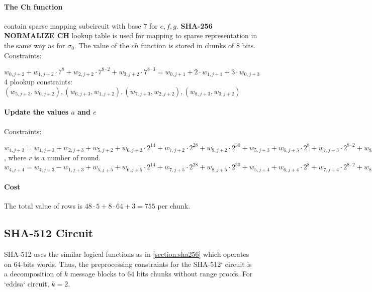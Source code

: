 \paragraph{The Ch function}
contain sparse mapping subcircuit with base $7$ for $e, f ,g$.
\textbf{SHA-256 NORMALIZE CH} lookup table is used for mapping to sparse representation in the same way as for $\sigma_0$.
The value of the $ ch $ function is stored in chunks of $8$ bits.
Constraints:
\begin{center}
    $w_{0, j + 2} + w_{1, j + 2} \cdot 7^8 + w_{2, j + 2} \cdot 7^{8 \cdot 2} + w_{3, j + 2} \cdot 7^{8 \cdot 3} = w_{0, j + 1} + 2 \cdot w_{1, j + 1} + 3 \cdot w_{0, j + 3}$ \\
    4 plookup constraints: $( w_{5, j + 3}, w_{0, j + 2}), ( w_{6, j + 3}, w_{1, j + 2}), (w_{7, j + 3}, w_{2, j + 2}), (w_{8, j + 3}, w_{3, j + 2})$ \\
\end{center}

\paragraph{Update the values $a$ and $e$}
Constraints:
\begin{center}
    $w_{4, j + 3} = w_{1, j + 3} + w_{2, j + 3} + w_{5, j + 2} + w_{6, j + 2} \cdot 2^{14} + w_{7, j + 2} \cdot  2^{28} + w_{8, j + 2} \cdot 2^{30} + w_{5, j + 3} + w_{6, j + 3} \cdot 2^8 + w_{7, j + 3} \cdot 2^{8 \cdot 2} + w_{8, j + 3} \cdot 2^{8 \cdot 3} + k[r] + w_{3, j + 3}$, where $r$ is a number of round. \\
    $w_{4, j + 4} = w_{4, j + 3} - w_{1, j + 3} + w_{5, j + 5} + w_{6, j + 5} \cdot 2^{14} + w_{7, j + 5} \cdot  2^{28} + w_{8, j + 5} \cdot 2^{30} + w_{5, j + 4} + w_{6, j + 4} \cdot 2^8 + w_{7, j + 4} \cdot 2^{8 \cdot 2} + w_{8, j + 4} \cdot 2^{8 \cdot 3}$
\end{center}

\paragraph{Cost}
The total value of rows is $48 \cdot 5 + 8 \cdot 64 + 3 = 755$ per chunk.

\subsection{SHA-512 Circuit}
\label{section:sha512}
SHA-512 uses the similar logical functions as in \ref{section:sha256} which operates on $64$-bits words.
Thus, the preprocessing constraints for the SHA-512` circuit is a decomposition of $k$ message blocks to $64$ bits chunks without range proofs. For `eddsa` circuit, $k = 2$.

